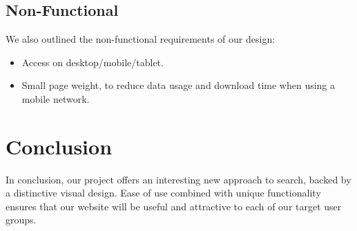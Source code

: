 \documentclass[10pt,a4paper]{article}
\begin{document}
\subsection*{Non-Functional}
We also outlined the non-functional requirements of our design:

\begin{itemize}
	\item Access on desktop/mobile/tablet.
	\item Small page weight, to reduce data usage and download time when using a mobile network.
\end{itemize}

\section*{Conclusion}
In conclusion, our project offers an interesting new approach to search, backed by a distinctive visual design. Ease of use combined with unique functionality ensures that our website will be useful and attractive to each of our target user groups.
\end{document}
